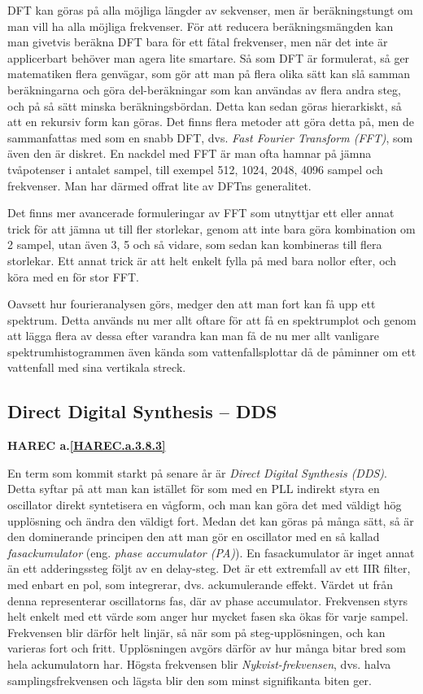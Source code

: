 DFT kan göras på alla möjliga längder av sekvenser, men är beräkningstungt
om man vill ha alla möjliga frekvenser.
För att reducera beräkningsmängden kan man givetvis beräkna DFT bara för ett
fåtal frekvenser, men när det inte är applicerbart behöver man agera lite
smartare.
Så som DFT är formulerat, så ger matematiken flera genvägar, som gör att man
på flera olika sätt kan slå samman beräkningarna och göra del-beräkningar som
kan användas av flera andra steg, och på så sätt minska beräkningsbördan.
Detta kan sedan göras hierarkiskt, så att en rekursiv form kan göras.
Det finns flera metoder att göra detta på, men de sammanfattas med som en
snabb DFT, dvs. \emph{Fast Fourier Transform (FFT)}, som även den är diskret.
En nackdel med FFT är man ofta hamnar på jämna tvåpotenser i antalet sampel,
till exempel 512, 1024, 2048, 4096 sampel och frekvenser.
Man har därmed offrat lite av DFTns generalitet.

Det finns mer avancerade formuleringar av FFT som utnyttjar ett eller annat
trick för att jämna ut till fler storlekar, genom att inte bara göra
kombination om 2 sampel, utan även 3, 5 och så vidare, som sedan kan kombineras till
flera storlekar.
Ett annat trick är att helt enkelt fylla på med bara nollor efter, och köra
med en för stor FFT.

Oavsett hur fourieranalysen görs, medger den att man fort kan få upp ett
spektrum.
Detta används nu mer allt oftare för att få en spektrumplot och genom att
lägga flera av dessa efter varandra kan man få de nu mer allt vanligare
spektrumhistogrammen även kända som vattenfallsplottar då de påminner om ett
vattenfall med sina vertikala streck.

\subsection{Direct Digital Synthesis -- DDS}
\textbf{HAREC a.\ref{HAREC.a.3.8.3}\label{myHAREC.a.3.8.3}}

En term som kommit starkt på senare år är \emph{Direct Digital Synthesis (DDS)}.
Detta syftar på att man kan istället för som med en PLL indirekt styra en
oscillator direkt syntetisera en vågform, och man kan göra det med väldigt
hög upplösning och ändra den väldigt fort.
Medan det kan göras på många sätt, så är den dominerande principen den att
man gör en oscillator med en så kallad \emph{fasackumulator} (eng. \emph{phase
 accumulator (PA)}).
En fasackumulator är inget annat än ett adderingssteg följt av en delay-steg.
Det är ett extremfall av ett IIR filter, med enbart en pol, som integrerar,
dvs. ackumulerande effekt.
Värdet ut från denna representerar oscillatorns fas, där av phase accumulator.
Frekvensen styrs helt enkelt med ett värde som anger hur mycket fasen ska
ökas för varje sampel.
Frekvensen blir därför helt linjär, så när som på steg-upplösningen, och kan
varieras fort och fritt.
Upplösningen avgörs därför av hur många bitar bred som hela ackumulatorn har.
Högsta frekvensen blir \emph{Nykvist-frekvensen}, dvs. halva
samplingsfrekvensen och lägsta blir den som minst signifikanta biten ger.

